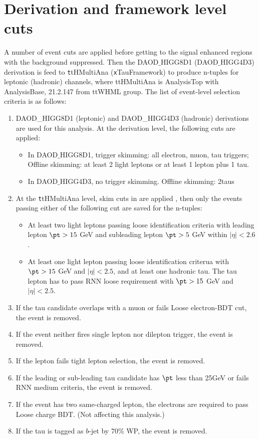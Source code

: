 \section{Derivation and framework level cuts}
\label{app:cuts}
A number of event cuts are applied before getting to the signal enhanced regions with the background suppressed. Then the DAOD$\_$HIGG8D1 (DAOD$\_$HIGG4D3) derivation is feed to {\texttt ttHMultiAna} ({\texttt xTauFramework}) to produce n-tuples for leptonic (hadronic) channels, where ttHMultiAna is AnalysisTop \cite{AnalysisTop} with AnalysisBase, 21.2.147 from ttWHML group.
The list of event-level selection criteria is as follows:

\begin{enumerate}
\item DAOD\_HIGG8D1 (leptonic) and DAOD\_HIGG4D3 (hadronic) derivations are used for this analysis. At the derivation level, the following cuts are applied:
  \begin{itemize}
  \item In DAOD$\_$HIGG8D1, trigger skimming: all electron, muon, tau triggers; Offline skimming: at least 2 light leptons or at least 1 lepton plus 1 tau.
  \item In DAOD$\_$HIGG4D3, no trigger skimming. Offline skimming: 2taus
  \end{itemize}
\item At the {\texttt ttHMultiAna} level, skim cuts in \cite{ATL-COM-PHYS-2018-410} are applied , then only the events passing either of the following cut are saved for the n-tuples:
  \begin{itemize}
  \item At least two light leptons passing loose identification criteria with leading lepton $\pt > 15$ GeV and subleading lepton $\pt > 5$ GeV within $|\eta|<2.6$.
  \item At least one light lepton passing loose identification criterua with $\pt >15$ GeV and $|\eta|<2.5$, and at least one hadronic tau. The tau lepton has to pass RNN loose requirement with $\pt >15$ GeV and $|\eta|<2.5$.
  \end{itemize}
\item If the tau candidate overlaps with a muon or fails Loose electron-BDT cut, the event is removed.
\item If the event neither fires single lepton nor dilepton trigger, the event is removed.
\item If the lepton fails tight lepton selection, the event is removed.
\item If the leading or sub-leading tau candidate has $\pt$ less than 25GeV or fails RNN medium criteria, the event is removed.
\item If the event has two same-charged lepton, the electrons are required to pass Loose charge BDT. (Not affecting this analysis.)
\item If the tau is tagged as $b$-jet by 70\% WP, the event is removed.




\end{enumerate}
